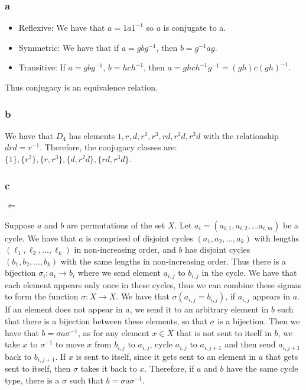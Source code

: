 \documentclass[]{article}
\begin{document}
\subsubsection*{a}
\begin{itemize}
	\item Reflexive: We have that $a = 1 a 1^{-1}$ so $a$ is conjugate to a.
	\item Symmetric: We have that if $a = g b g^{-1}$, then $b = g^{-1} a g$. 
	\item Transitive: If $a = g b g^{-1}$, $b = h c h^{-1}$, then $a = gh c h^{-1} g^{-1} = (gh) c (gh)^{-1}$. 
\end{itemize}
Thus conjugacy is an equivalence relation. 
\subsubsection*{b}
We have that $D_4$ has elements $1, r, d, r^2, r^3, rd, r^2d, r^3d$ with the relationship $drd = r^{-1}$. Therefore, the conjugacy classes are: $\lbrace 1 \rbrace, \lbrace r^2 \rbrace, \lbrace r, r^3 \rbrace, \lbrace d, r^2 d \rbrace, \lbrace rd, r^3 d \rbrace$. 
\subsubsection*{c}
\paragraph{$\Leftarrow$}
Suppose $a$ and $b$ are permutations of the set $X$. Let $a_i = (a_{i, 1}, a_{i, 2}, ...a_{i, m})$ be a cycle. We have that $a$ is comprised of disjoint cycles $(a_1, a_2, ..., a_k)$ with lengths $(\ell_1, \ell_2, ..., \ell_k)$ in non-increasing order, and $b$ has disjoint cycles $(b_1, b_2, ..., b_k)$ with the same lengths in non-increasing order. Thus there is a bijection $\sigma_i : a_i \rightarrow b_i$ where we send element $a_{i, j}$ to $b_{i, j}$ in the cycle.  We have that each element appears only once in these cycles, thus we can combine these sigmas to form the function $\sigma: X \rightarrow X$. We have that $\sigma(a_{i, j} = b_{i,j})$, if $a_{i,j}$ appears in $a$. If an element does not appear in $a$, we send it to an arbitrary element in $b$ such that there is a bijection between these elements, so that $\sigma$ is a bijection. Then we have that $b = \sigma a \sigma^{-1}$, as for any element $x \in X$ that is not sent to itself in $b$, we take $x$ to $\sigma^{-1}$ to move $x$ from $b_{i,j}$ to $a_{i,j}$, cycle $a_{i,j}$ to $a_{i, j+1}$ and then send $a_{i, j+1}$ back to $b_{i, j+1}$. If $x$ is sent to itself, since it gets sent to an element in $a$ that gets sent to itself, then $\sigma$ takes it back to $x$. Therefore, if $a$ and $b$ have the same cycle type, there is a $\sigma$ such that $b = \sigma a \sigma^{-1}$. 
\end{document}
